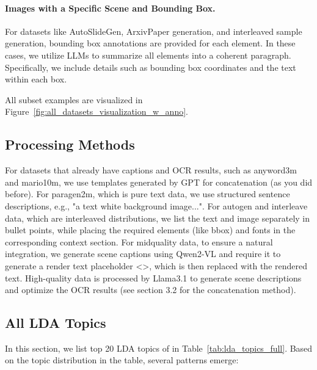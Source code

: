 \paragraph{Images with a Specific Scene and Bounding Box.}
For datasets like AutoSlideGen, ArxivPaper generation, and interleaved sample generation, bounding box annotations are provided for each element. In these cases, we utilize LLMs to summarize all elements into a coherent paragraph. Specifically, we include details such as bounding box coordinates and the text within each box.

All subset examples are visualized in Figure~\ref{fig:all_datasets_visualization_w_anno}.





\subsection{Processing Methods}
For datasets that already have captions and OCR results, such as anyword3m and mario10m, we use templates generated by GPT for concatenation (as you did before). For paragen2m, which is pure text data, we use structured sentence descriptions, e.g., "a text white background image...". For autogen and interleave data, which are interleaved distributions, we list the text and image separately in bullet points, while placing the required elements (like bbox) and fonts in the corresponding context section. For midquality data, to ensure a natural integration, we generate scene captions using Qwen2-VL and require it to generate a render text placeholder <>, which is then replaced with the rendered text. High-quality data is processed by Llama3.1 to generate scene descriptions and optimize the OCR results (see section 3.2 for the concatenation method).

\subsection{All LDA Topics}
\label{sec:all_lda}

In this section, we list top 20 LDA topics of \DatasetName in Table~\ref{tab:lda_topics_full}.
Based on the topic distribution in the table, several patterns emerge:

